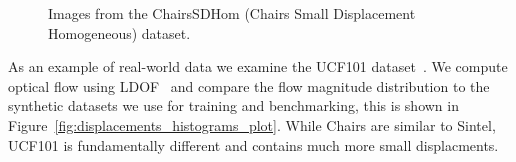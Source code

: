 \documentclass[10pt,twocolumn,letterpaper]{article}%
\newcommand{\chairs}{\mbox{Chairs}\xspace}
\begin{document}
\begin{figure}
\centering
{}%
\caption{Images from the ChairsSDHom (Chairs Small Displacement Homogeneous) dataset.}
\label{fig:small_displacement_chairs}
\end{figure}

As an example of real-world data we examine the UCF101 dataset~\cite{ucf101}. We compute optical flow using LDOF~\cite{DFIB15} and compare the flow magnitude distribution to the synthetic datasets we use for training and benchmarking, this is shown in Figure~\ref{fig:displacements_histograms_plot}. 
While \chairs are similar to Sintel,
UCF101 is fundamentally different and contains much more small displacments.
\end{document}
